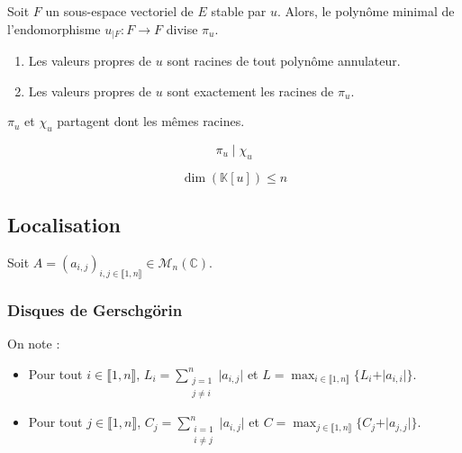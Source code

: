   \begin{proposition}
    Soit $F$ un sous-espace vectoriel de $E$ stable par $u$. Alors, le polynôme minimal de l'endomorphisme $u_{|F} : F \rightarrow F$ divise $\pi_u$.
  \end{proposition}

  \begin{proposition}
    \begin{enumerate}[label=(\roman*)]
      \item Les valeurs propres de $u$ sont racines de tout polynôme annulateur.
      \item Les valeurs propres de $u$ sont exactement les racines de $\pi_u$.
    \end{enumerate}
  \end{proposition}


  \begin{remark}
    $\pi_u$ et $\chi_u$ partagent dont les mêmes racines.
  \end{remark}


  \begin{theorem}
    \[ \pi_u \mid \chi_u \]
  \end{theorem}

  \begin{corollary}
    \[ \dim(\mathbb{K}[u]) \leq n \]
  \end{corollary}

  \subsection{Localisation}

  Soit $A = (a_{i,j})_{i, j \in \llbracket 1, n \rrbracket} \in \mathcal{M}_n(\mathbb{C})$.

  \subsubsection{Disques de Gerschgörin}


  \begin{notation}
    On note :
    \begin{itemize}
      \item Pour tout $i \in \llbracket 1, n \rrbracket$, $L_i = \sum_{\substack{j=1 \\ j \neq i}}^n \vert a_{i,j} \vert$ et $L = \max_{i \in \llbracket 1, n \rrbracket} \{ L_i + \vert a_{i,i} \vert \}$.
      \item Pour tout $j \in \llbracket 1, n \rrbracket$, $C_j = \sum_{\substack{i=1 \\ i \neq j}}^n \vert a_{i,j} \vert$ et $C = \max_{j \in \llbracket 1, n \rrbracket} \{ C_j + \vert a_{j,j} \vert \}$.
    \end{itemize}
  \end{notation}

